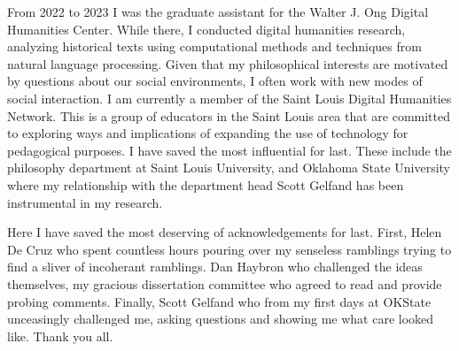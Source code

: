 \documentclass[phdthesis,12pt,final,a4paper]{wuthesis}
\theoremstyle{definition}
\theoremstyle{definition}
\theoremstyle{definition}
\theoremstyle{definition}
\theoremstyle{remark}
\begin{document}
\begin{thesisacknowledgments}
From 2022 to 2023 I was the graduate assistant for the Walter J. Ong Digital Humanities Center. While there, I conducted digital humanities research, analyzing historical texts using computational methods and techniques from natural language processing. Given that my philosophical interests are motivated by questions about our social environments, I often work with new modes of social interaction. I am currently a member of the Saint Louis Digital Humanities Network. This is a group of educators in the Saint Louis area that are committed to exploring ways and implications of expanding the use of technology for pedagogical purposes. I have saved the most influential for last. These include the philosophy department at Saint Louis University, and Oklahoma State University where my relationship with the department head Scott Gelfand has been instrumental in my research.

Here I have saved the most deserving of acknowledgements for last. First, Helen De Cruz who spent countless hours pouring over my senseless ramblings trying to find a sliver of incoherant ramblings. Dan Haybron who challenged the ideas themselves, my gracious dissertation committee who agreed to read and provide probing comments. Finally, Scott Gelfand who from my first days at OKState unceasingly challenged me, asking questions and showing me what care looked like. Thank you all.
\end{thesisacknowledgments}

\begin{singlespace}
  \renewcommand\contentsname{\chapter*{Table of Contents}}
\tableofcontents
\end{singlespace}


\cleardoublepage
\listoffigures
\end{document}
